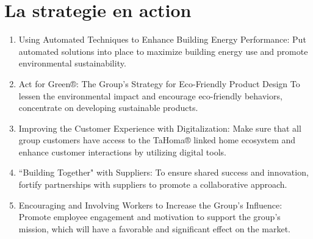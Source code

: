\section{La strategie en action}
\begin{enumerate}
	\item Using Automated Techniques to Enhance Building Energy Performance: Put automated solutions into place to maximize building energy use and promote environmental sustainability.
	\item  Act for Green®: The Group's Strategy for Eco-Friendly Product Design To lessen the environmental impact and encourage eco-friendly behaviors, concentrate on developing sustainable products.
    \item  Improving the Customer Experience with Digitalization: Make sure that all group customers have access to the TaHoma® linked home ecosystem and enhance customer interactions by utilizing digital tools.
    \item “Building Together" with Suppliers: To ensure shared success and innovation, fortify partnerships with suppliers to promote a collaborative approach.
    \item Encouraging and Involving Workers to Increase the Group's Influence: Promote employee engagement and motivation to support the group's mission, which will have a favorable and significant effect on the market.
\end{enumerate}







